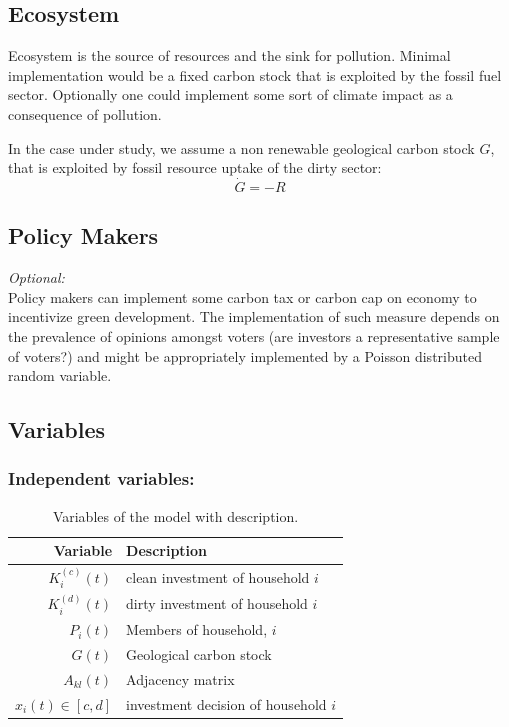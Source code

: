 \subsection{Ecosystem}
Ecosystem is the source of resources and the sink for pollution. Minimal implementation would be a fixed carbon stock that is exploited by the fossil fuel sector. Optionally one could implement some sort of climate impact as a consequence of pollution.

In the case under study, we assume a non renewable geological carbon stock $G$, that is exploited by fossil resource uptake of the dirty sector:
\begin{equation}
	\dot{G} = -R
	\label{resource_dynamics}
\end{equation}

\subsection{Policy Makers}
\textit{Optional:} \\
Policy makers can implement some carbon tax or carbon cap on economy to incentivize green development. The implementation of such measure depends on the prevalence of opinions amongst voters (are investors a representative sample of voters?) and might be appropriately implemented by a Poisson distributed random variable.

\subsection{Variables}

\subsubsection{Independent variables:}

\begin{table}[H]
	\centering
	\begin{tabular}{r|l}
		Variable & Description \\\hline
		$K^{(c)}_i(t)$ & clean investment of household $i$ \\
		$K^{(d)}_i(t)$ & dirty investment of household $i$ \\
		$P_i(t)$ & Members of household, $i$ \\
		$G(t)$ & Geological carbon stock \\
		$A_{kl}(t)$ & Adjacency matrix \\
		$x_i(t) \in [c,d]$ & investment decision of household $i$ 
	\end{tabular}
	\caption{Variables of the model with description.}
	\label{tab:independent_variables}
\end{table}

